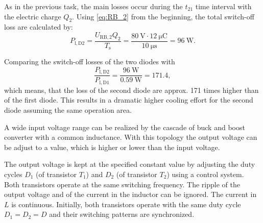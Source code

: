 \begin{solutionblock}
    As in the previous task, the main losses occur during the $t_{21}$ time interval with the electric charge $Q_{2}$. Using \eqref{eq:RB_2} from the beginning, the total switch-off loss are calculated by:
    \begin{equation}
        P_{\mathrm{l,D2}} = \frac{U_{\mathrm{RB,2}}Q_2}{T_{\mathrm{s}}}
        = \frac{\SI{80}{\volt}\cdot\SI{12}{\micro\coulomb}}{\SI{10}{\micro\second}} = \SI{96}{\watt}.
    \end{equation}

    Comparing the switch-off losses of the two diodes with
    \begin{equation}
        \frac{P_{\mathrm{l,D2}}}{P_{\mathrm{l,D1}}} = \frac{\SI{96}{\watt}}{\SI{0.59}{\watt}} = 171.4,
    \end{equation}
    which means, that the loss of the second diode are approx. 171 times higher than of the first diode. This results in a dramatic higher cooling effort for the second diode assuming the same operation area.

\end{solutionblock}




A wide input voltage range can be realized by the cascade of buck and boost converter with a common inductance.
With this topology the output voltage can be adjust to a value, which is higher or lower than the input voltage.
\par

\par


The output voltage is kept at the specified constant value by adjusting the duty cycles $D_1$ 
(of transistor  $T_1$) and $D_2$ (of transistor $T_2$) using a control system. Both transistors operate at the same switching frequency.
The ripple of the output voltage and of the current in the inductor can be ignored. The current in $L$ is continuous.
Initially, both transistors operate with the same duty cycle $D_1 = D_2 = D$ and their switching patterns are synchronized.



